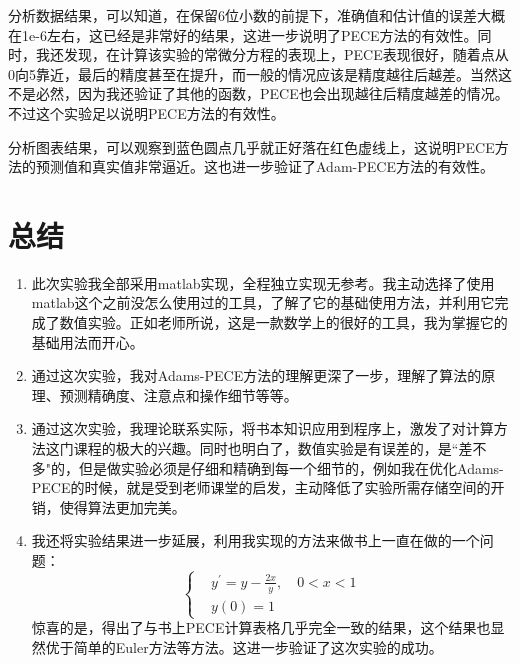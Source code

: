 \documentclass{LabReport}
\begin{document}
	分析数据结果，可以知道，在保留6位小数的前提下，准确值和估计值的误差大概在1e-6左右，这已经是非常好的结果，这进一步说明了PECE方法的有效性。同时，我还发现，在计算该实验的常微分方程的表现上，PECE表现很好，随着点从0向5靠近，最后的精度甚至在提升，而一般的情况应该是精度越往后越差。当然这不是必然，因为我还验证了其他的函数，PECE也会出现越往后精度越差的情况。不过这个实验足以说明PECE方法的有效性。\par
	
	分析图表结果，可以观察到蓝色圆点几乎就正好落在红色虚线上，这说明PECE方法的预测值和真实值非常逼近。这也进一步验证了Adam-PECE方法的有效性。

\section{总结}

\begin{enumerate}
	\item 此次实验我全部采用matlab实现，全程独立实现无参考。我主动选择了使用matlab这个之前没怎么使用过的工具，了解了它的基础使用方法，并利用它完成了数值实验。正如老师所说，这是一款数学上的很好的工具，我为掌握它的基础用法而开心。
	\item 通过这次实验，我对Adams-PECE方法的理解更深了一步，理解了算法的原理、预测精确度、注意点和操作细节等等。
	\item 通过这次实验，我理论联系实际，将书本知识应用到程序上，激发了对计算方法这门课程的极大的兴趣。同时也明白了，数值实验是有误差的，是``差不多"的，但是做实验必须是仔细和精确到每一个细节的，例如我在优化Adams-PECE的时候，就是受到老师课堂的启发，主动降低了实验所需存储空间的开销，使得算法更加完美。
	\item 我还将实验结果进一步延展，利用我实现的方法来做书上一直在做的一个问题：
	\[
	\left\{
	\begin{aligned}
		&y^\prime = y - \frac{2x}{y}, \quad 0 < x < 1 \\
		&y(0) = 1 
	\end{aligned}
	\right.
	\]
	惊喜的是，得出了与书上PECE计算表格几乎完全一致的结果，这个结果也显然优于简单的Euler方法等方法。这进一步验证了这次实验的成功。
\end{enumerate}
\end{document}
